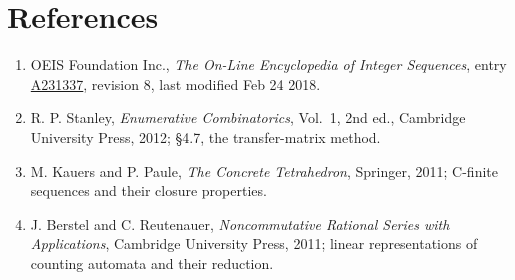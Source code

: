 \documentclass[11pt]{article}
\theoremstyle{definition}
\begin{document}
\section{References}

\begin{enumerate}

\item OEIS Foundation Inc., \emph{The On-Line Encyclopedia of Integer Sequences}, entry \href{https://oeis.org/A231337}{A231337}, revision 8, last modified Feb 24 2018.

\item R. P. Stanley, \emph{Enumerative Combinatorics}, Vol.~1, 2nd ed., Cambridge University Press, 2012; \S4.7, the transfer-matrix method.

\item M. Kauers and P. Paule, \emph{The Concrete Tetrahedron}, Springer, 2011; C-finite sequences and their closure properties.

\item J. Berstel and C. Reutenauer, \emph{Noncommutative Rational Series with Applications}, Cambridge University Press, 2011; linear representations of counting automata and their reduction.

\end{enumerate}
\end{document}
